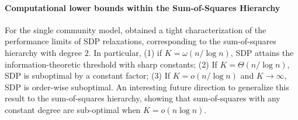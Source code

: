 



\paragraph{Computational lower bounds within the Sum-of-Squares Hierarchy} 
For the single community model, 
\cite{HajekWuXu_one_sdp15} obtained a tight characterization of the performance limits of SDP relaxations, corresponding to the sum-of-squares hierarchy with degree $2$. In particular, (1) if $K = \omega(n/ \log n)$, SDP attains the information-theoretic threshold with sharp constants; (2) If $K = \Theta(n/ \log n)$, SDP is suboptimal by a constant factor; (3) If $K = o(n/ \log n)$ and $K \to \infty$, SDP is order-wise suboptimal.
An interesting future direction to generalize this result to the sum-of-squares hierarchy, showing that sum-of-squares  with any constant degree are sub-optimal when $K=o(n\log n)$.

